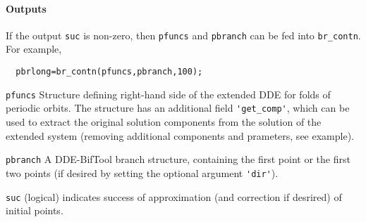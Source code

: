 \documentclass[11pt]{scrartcl}
\newcommand{\blist}[1]{\mbox{\lstinline!#1!}}  \newlength{\tabw}
\begin{document}
\paragraph{Outputs}
If the output \blist{suc} is non-zero, then \blist{pfuncs} and \blist{pbranch} can be fed into \blist{br_contn}. For example,
\begin{lstlisting}
  pbrlong=br_contn(pfuncs,pbranch,100);
\end{lstlisting}
\begin{compactitem}
\item \blist{pfuncs} Structure defining right-hand side of the
  extended DDE for folds of periodic orbits. The structure has an
  additional field \blist{'get_comp'}, which can be used to extract
  the original solution components from the solution of the extended
  system (removing additional components and prameters, see example).
\item \blist{pbranch} A DDE-BifTool branch structure, containing the
  first point or the first two points (if desired by setting the
  optional argument \blist{'dir'}).
\item \blist{suc} (logical) indicates success of approximation (and
  correction if desrired) of initial points.
\end{compactitem}
\end{document}
